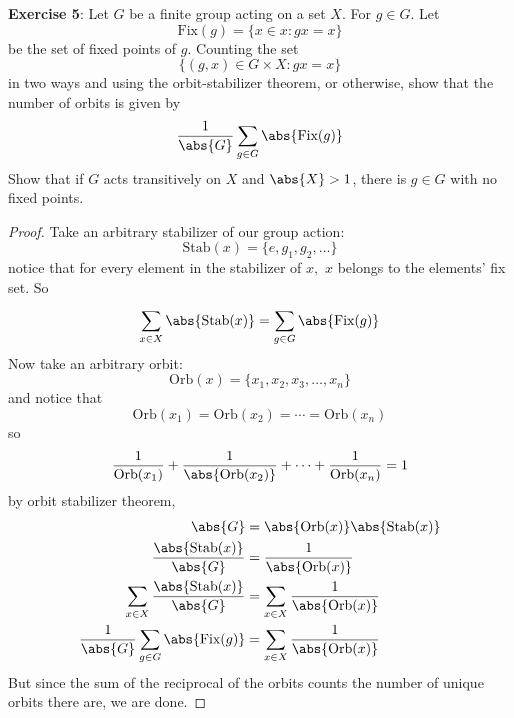\documentclass{article}
\begin{document}
\textbf{Exercise 5}: Let $G$ be a finite group acting on a set $X$. For $g \in G$. Let 
\begin{equation*}
	\text{Fix}(g) = \{x \in x : gx = x\}
\end{equation*}
be the set of fixed points of $g$. Counting the set
\begin{equation*}
	\{(g, x) \in G \times X : gx = x\}
\end{equation*}
in two ways and using the orbit-stabilizer theorem, or otherwise, show that the number of orbits is given by 
\begin{equation*}
	\dfrac{1}{\abs{G}}\sum_{g \in G}^{}\abs{\text{Fix}(g)}
\end{equation*}
Show that if $G$ acts transitively on $X$ and $\abs{X} > 1$, there is $g \in G$ with no fixed points.
\begin{proof}
	Take an arbitrary stabilizer of our group action:
	\begin{equation*}
		\text{Stab}(x) = \{e, g_{1}, g_{2}, \ldots\}
	\end{equation*}
	notice that for every element in the stabilizer of $x,$ $x$ belongs to the elements' fix set. So
	\begin{equation*}
		\sum_{x \in X}^{}\abs{\text{Stab}(x)} = \sum_{g \in G}^{}\abs{\text{Fix}(g)}
	\end{equation*}
	Now take an arbitrary orbit:
	\begin{equation*}
		\text{Orb}(x) = \{x_{1}, x_{2}, x_{3}, \ldots, x_{n}\}
	\end{equation*}
	and notice that 
	\begin{equation*}
		\text{Orb}(x_{1}) = \text{Orb}(x_{2}) = \cdots = \text{Orb}(x_{n})
	\end{equation*}
	so
	\begin{equation*}
		\dfrac{1}{\text{Orb}(x_{1})} + \dfrac{1}{\abs{\text{Orb}(x_{2})}} + \cdots + \dfrac{1}{\text{Orb}(x_{n})} = 1
	\end{equation*}
	by orbit stabilizer theorem,
	\begin{align*}
		\abs{G} &= \abs{\text{Orb}(x)}\abs{\text{Stab}(x)} \\
		\dfrac{\abs{\text{Stab}(x)}}{\abs{G}} &= \dfrac{1}{\abs{\text{Orb}(x)}} \\
		\sum_{x \in X}^{}\dfrac{\abs{\text{Stab}(x)}}{\abs{G}} &= \sum_{x \in X}^{}\dfrac{1}{\abs{\text{Orb}(x)}} \\
		\dfrac{1}{\abs{G}}\sum_{g \in G}^{}\abs{\text{Fix}(g)} &= \sum_{x \in X}^{}\dfrac{1}{\abs{\text{Orb}(x)}}
	\end{align*}
	But since the sum of the reciprocal of the orbits counts the number of unique orbits there are, we are done.
\end{proof}
\end{document}
